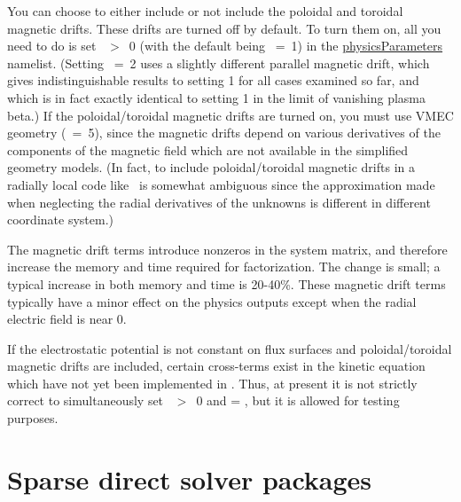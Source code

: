 You can choose to either include or not include the poloidal and toroidal magnetic drifts.
These drifts are turned off by default.  To turn them on, all you need to do is
set ~$>$~0 (with the default being ~=~1) in the {\ttfamily \hyperref[sec:physicsParameters]{physicsParameters}} namelist. 
(Setting ~=~2 uses a slightly different parallel magnetic drift, which gives
indistinguishable results to setting 1 for all cases examined so far, and which is in fact exactly identical to setting 1
in the limit of vanishing plasma beta.)
If the poloidal/toroidal magnetic drifts are turned on, you must use VMEC
geometry (~=~5), since the magnetic drifts
depend on various derivatives of the components of the magnetic field which
are not available in the simplified geometry models. 
(In fact, to include poloidal/toroidal magnetic drifts in a radially local code like \sfincs~is somewhat ambiguous since the approximation made when neglecting the radial derivatives of the unknowns is different in different coordinate system.)

The magnetic drift terms introduce nonzeros in the system matrix,
and therefore increase the memory and time required for factorization.
The change is small; a typical increase in both memory and time is 20-40\%.
These magnetic drift terms typically have a minor effect on the physics outputs except when the radial
electric field is near 0.

If the electrostatic potential is not constant on flux surfaces and poloidal/toroidal magnetic drifts
are included, certain cross-terms exist in the kinetic equation which have not yet been implemented in \sfincs.
Thus, at present it is not strictly correct to simultaneously set  ~$>$~0 
and   = \true, but it is allowed for testing purposes. 

\section{Sparse direct solver packages}
\label{sec:solvers}

